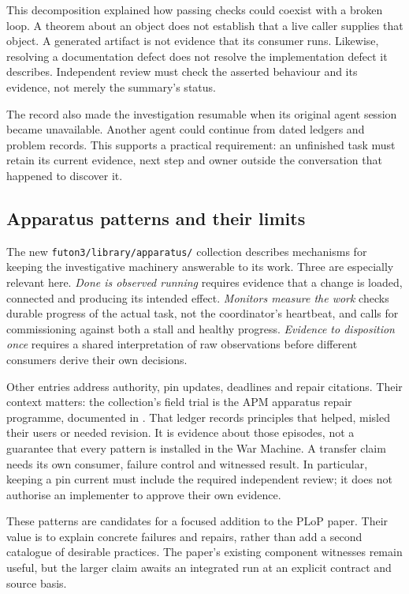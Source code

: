 This decomposition explained how passing checks could coexist with a broken
loop. A theorem about an object does not establish that a live caller supplies
that object. A generated artifact is not evidence that its consumer runs.
Likewise, resolving a documentation defect does not resolve the implementation
defect it describes. Independent review must check the asserted behaviour and
its evidence, not merely the summary's status.

The record also made the investigation resumable when its original agent
session became unavailable. Another agent could continue from dated ledgers
and problem records. This supports a practical requirement: an unfinished task
must retain its current evidence, next step and owner outside the conversation
that happened to discover it.

\subsection*{Apparatus patterns and their limits}\label{sec:apparatus-quality}

The new \texttt{futon3/library/apparatus/} collection describes mechanisms for
keeping the investigative machinery answerable to its work. Three are
especially relevant here. \emph{Done is observed running} requires evidence
that a change is loaded, connected and producing its intended effect.
\emph{Monitors measure the work} checks durable progress of the actual task,
not the coordinator's heartbeat, and calls for commissioning against both a
stall and healthy progress. \emph{Evidence to disposition once} requires a
shared interpretation of raw observations before different consumers derive
their own decisions.

Other entries address authority, pin updates, deadlines and repair citations.
Their context matters: the collection's field trial is the APM apparatus repair
programme, documented in
.
That ledger records principles that helped, misled their users or needed
revision. It is evidence about those episodes, not a guarantee that every
pattern is installed in the War Machine. A transfer claim needs its own
consumer, failure control and witnessed result. In particular, keeping a pin
current must include the required independent review; it does not authorise
an implementer to approve their own evidence.

These patterns are candidates for a focused addition to the PLoP paper. Their
value is to explain concrete failures and repairs, rather than add a second
catalogue of desirable practices. The paper's existing component witnesses
remain useful, but the larger claim awaits an integrated run at an explicit
contract and source basis.

